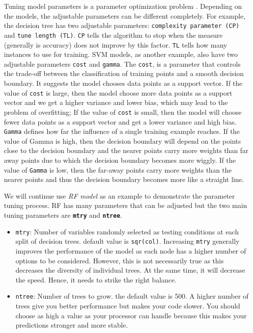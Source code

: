 \documentclass[
]{book}
\begin{document}
Tuning model parameters is a parameter optimization problem \citep{Brownlee2021}. Depending on the models, the adjustable parameters can be different completely. For example, the decision tree has two adjustable parameters: \texttt{complexity\ parameter\ (CP)} and \texttt{tune\ length\ (TL)}. \texttt{CP} tells the algorithm to stop when the measure (generally is accuracy) does not improve by this factor. \texttt{TL} tells how many instances to use for training. SVM models, as another example, also have two adjustable parameters \texttt{cost} and \texttt{gamma}. The \texttt{cost}, is a parameter that controls the trade-off between the classification of training points and a smooth decision boundary. It suggests the model chooses data points as a support vector. If the value of \texttt{cost} is large, then the model choose more data points as a support vector and we get a higher variance and lower bias, which may lead to the problem of overfitting; If the value of \texttt{cost} is small, then the model will choose fewer data points as a support vector and get a lower variance and high bias. \texttt{Gamma} defines how far the influence of a single training example reaches. If the value of Gamma is high, then the decision boundary will depend on the points close to the decision boundary and the nearer points carry more weights than far away points due to which the decision boundary becomes more wiggly. If the value of \texttt{Gamma} is low, then the far-away points carry more weights than the nearer points and thus the decision boundary becomes more like a straight line.

We will continue use \emph{RF model} as an example to demonstrate the parameter tuning process. RF has many parameters that can be adjusted but the two main tuning parameters are \textbf{\texttt{mtry}} and \textbf{\texttt{ntree}}.

\begin{itemize}
\item
  \texttt{mtry}: Number of variables randomly selected as testing conditions at each split of decision trees. default value is \texttt{sqr(col)}.
  Increasing \texttt{mtry} generally improves the performance of the model as each node has a higher number of options to be considered. However, this is not necessarily true as this decreases the diversity of individual trees. At the same time, it will decrease the speed. Hence, it needs to strike the right balance.
\item
  \texttt{ntree}: Number of trees to grow. the default value is 500. A higher number of trees give you better performance but makes your code slower. You should choose as high a value as your processor can handle because this makes your predictions stronger and more stable.
\end{itemize}
\end{document}
